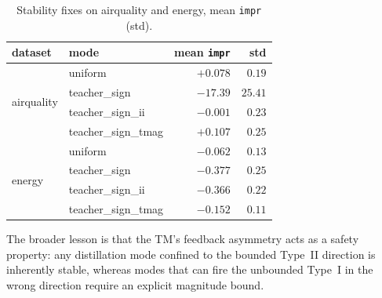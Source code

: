 \begin{table}[t]
\centering
\footnotesize
\caption{Stability fixes on airquality and energy, mean \texttt{impr} (std).}
\label{tab:stability}
\begin{tabular}{llrr}
\toprule
dataset & mode & mean \texttt{impr} & std \\
\midrule
\multirow{4}{*}{airquality}
  & uniform            & $+0.078$  & $0.19$ \\
  & teacher\_sign      & $-17.39$  & $25.41$ \\
  & teacher\_sign\_ii  & $-0.001$  & $0.23$ \\
  & teacher\_sign\_tmag& $\mathbf{+0.107}$ & $0.25$ \\
\midrule
\multirow{4}{*}{energy}
  & uniform            & $-0.062$  & $0.13$ \\
  & teacher\_sign      & $-0.377$  & $0.25$ \\
  & teacher\_sign\_ii  & $-0.366$  & $0.22$ \\
  & teacher\_sign\_tmag& $\mathbf{-0.152}$ & $0.11$ \\
\bottomrule
\end{tabular}
\end{table}

The broader lesson is that the TM's feedback asymmetry acts as a safety property: any
distillation mode confined to the bounded Type~II direction is inherently stable, whereas
modes that can fire the unbounded Type~I in the wrong direction require an explicit
magnitude bound.
